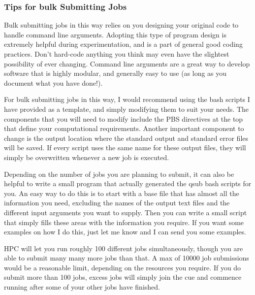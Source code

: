 
\subsubsection{Tips for bulk Submitting Jobs}
Bulk submitting jobs in this way relies on you designing your original code to handle command line arguments. Adopting this type of program design is extremely helpful during experimentation, and is a part of general good coding practices. Don't hard-code anything you think may even have the slightest possibility of ever changing. Command line arguments are a great way to develop software that is highly modular, and generally easy to use (as long as you document what you have done!).
%
%
\par
%
%
For bulk submitting jobs in this way, I would recommend using the bash scripts I have provided as a template, and simply modifying them to suit your needs. The components that you will need to modify include the PBS directives at the top that define your computational requirements. Another important component to change is the output location where the standard output and standard error files will be saved. If every script uses the same name for these output files, they will simply be overwritten whenever a new job is executed.
%
%
\par
Depending on the number of jobs you are planning to submit, it can also be helpful to write a small program that actually generated the qsub bash scripts for you. An easy way to do this is to start with a base file that has almost all the information you need, excluding the names of the output text files and the different input arguments you want to supply. Then you can write a small script that simply fills these areas with the information you require. If you want some examples on how I do this, just let me know and I can send you some examples.
%
%
\par
HPC will let you run roughly 100 different jobs simultaneously, though you are able to submit many many more jobs than that. A max of 10000 job submissions would be a reasonable limit, depending on the resources you require. If you do submit more than 100 jobs, excess jobs will simply join the cue and commence running after some of your other jobs have finished.
%
%
%
